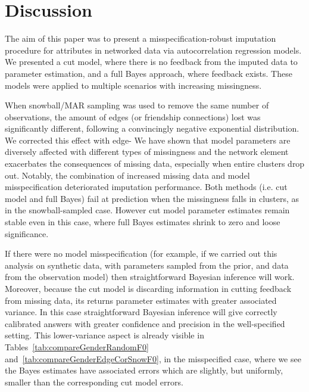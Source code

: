 \documentclass{article}
\begin{document}

\section{Discussion}
The aim of this paper was to present a misspecification-robust imputation procedure for attributes in networked data via autocorrelation regression models. We presented a cut model, where there is no feedback from the imputed data to parameter estimation, and a full Bayes approach, where feedback exists. These models were applied to multiple scenarios with increasing missingness.

When snowball/MAR sampling was used to remove the same number of observations, the amount of edges (or friendship connections) lost was significantly different, following a convincingly negative exponential distribution. We corrected this effect with edge- We have shown that model parameters are diversely affected with different types of missingness and the network element exacerbates the consequences of missing data, especially when entire clusters drop out. Notably, the combination of increased missing data and model misspecification deteriorated imputation performance. 
Both methods (i.e. cut model and full Bayes) fail at prediction when the missingness falls in clusters, as in the snowball-sampled case. However cut model parameter estimates remain stable even in this case, where full Bayes estimates shrink to zero and loose significance.

If there were no model misspecification (for example, if we carried out this analysis on synthetic data, with parameters sampled from the prior, and data from the observation model) then straightforward Bayesian inference will
work. Moreover, because the cut model is discarding information in cutting feedback from
missing data, its returns parameter estimates with greater associated variance. In this case straightforward Bayesian inference will give correctly calibrated answers with greater confidence and precision in the well-specified setting. This lower-variance aspect is already visible in Tables~\ref{tab:compareGenderRandomF0} and~\ref{tab:compareGenderEdgeCorSnowF0}, in the misspecified case,
where we see the Bayes estimates have associated errors which are slightly, but uniformly, smaller than the corresponding cut model errors.
\end{document}
